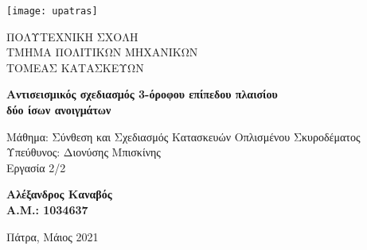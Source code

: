 \pagestyle{empty}
\begin{titlepage}
	\begin{center}

		\vspace*{0cm}

		\texttt{[image: upatras]}

		\normalsize
		{ΠΟΛΥΤΕΧΝΙΚΗ ΣΧΟΛΗ\\ΤΜΗΜΑ ΠΟΛΙΤΙΚΩΝ ΜΗΧΑΝΙΚΩΝ\\ΤΟΜΕΑΣ ΚΑΤΑΣΚΕΥΩΝ}

		\vspace{4.5cm}

		\large
		\textbf{Αντισεισμικός σχεδιασμός 3-όροφου επίπεδου πλαισίου}\\
		\textbf{δύο ίσων ανοιγμάτων}

		\vspace{3cm}

		\normalsize
		{Μάθημα: Σύνθεση και Σχεδιασμός Κατασκευών Οπλισμένου Σκυροδέματος\\Υπεύθυνος: Διονύσης Μπισκίνης\\Εργασία 2/2}

		\vspace{3cm}

		\large
		\textbf{Αλέξανδρος Καναβός\\Α.Μ.: 1034637}

		\vfill

		\normalsize
		{Πάτρα, Μάιος 2021}

	\end{center}
\end{titlepage}
